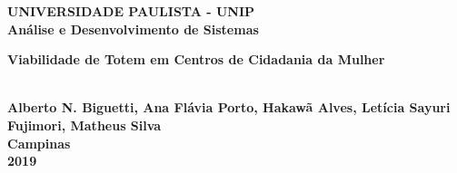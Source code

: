 \thispagestyle{empty}
\begin{center}
	\normalsize{\textbf{UNIVERSIDADE PAULISTA - UNIP}}\\[0.3pc]
	\normalsize{\textbf{Análise e Desenvolvimento de Sistemas}}\\[7pc]
	
	\parbox{10cm}{\begin{center}\normalsize{\textbf{Viabilidade de Totem em Centros de Cidadania da Mulher}}\end{center}}\\

	\vspace{160pt}
	\normalsize{\textbf{Alberto N. Biguetti, Ana Flávia Porto, Hakawã Alves, Letícia Sayuri Fujimori, Matheus Silva}}\\[1pc]
	\vfill
	\normalsize{\textbf{Campinas}}\\[1pc]
	\normalsize{\textbf{2019}}
\end{center}
\newpage 